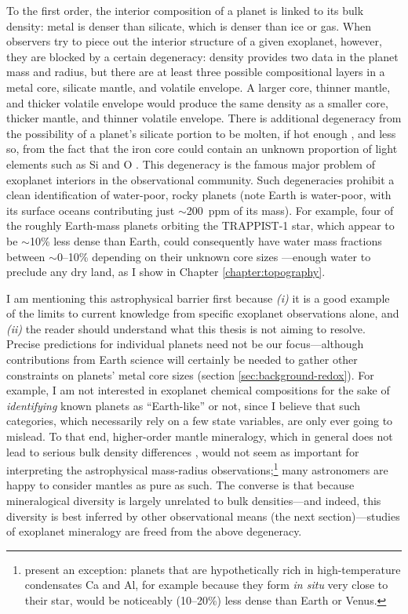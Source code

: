 To the first order, the interior composition of a planet is linked to its bulk density: metal is denser than silicate, which is denser than ice or gas. When observers try to piece out the interior structure of a given exoplanet, however, they are blocked by a certain degeneracy: density provides two data in the planet mass and radius, but there are at least three possible compositional layers in a metal core, silicate mantle, and volatile envelope. A larger core, thinner mantle, and thicker volatile envelope would produce the same density as a smaller core, thicker mantle, and thinner volatile envelope. There is additional degeneracy from the possibility of a planet's silicate portion to be molten, if hot enough \citep[inducing $\sim$10\% density variations;][]{bower_linking_2019}, and less so, from the fact that the iron core could contain an unknown proportion of light elements such as Si and O \citep{unterborn_scaling_2016}. This degeneracy is the famous major problem of exoplanet interiors in the observational community. Such degeneracies prohibit a clean identification of water-poor, rocky planets (note Earth is water-poor, with its surface oceans contributing just $\sim$200~ppm of its mass). For example, four of the roughly Earth-mass planets orbiting the TRAPPIST-1 star, which appear to be $\sim$10\% less dense than Earth, could consequently have water mass fractions between $\sim$0--10\% depending on their unknown core sizes \citep{unterborn_inward_2018, agol_refining_2021}---enough water to preclude any dry land, as I show in Chapter \ref{chapter:topography}. 

I am mentioning this astrophysical barrier first because \textit{(i)} it is a good example of the limits to current knowledge from specific exoplanet observations alone, and \textit{(ii)} the reader should understand what this thesis is not aiming to resolve. Precise predictions for individual planets need not be our focus---although contributions from Earth science will certainly be needed to gather other constraints on planets' metal core sizes (section \ref{sec:background-redox}). For example, I am not interested in exoplanet chemical compositions for the sake of \textit{identifying} known planets as ``Earth-like'' or not, since I believe that such categories, which necessarily rely on a few state variables, are only ever going to mislead. To that end, higher-order mantle mineralogy, which in general does not lead to serious bulk density differences \citep{dorn_can_2015, unterborn_scaling_2016}, would not seem as important for interpreting the astrophysical mass-radius observations;\footnote{\citet{dorn_new_2019} present an exception: planets that are hypothetically rich in high-temperature condensates Ca and Al, for example because they form \textit{in situ} very close to their star, would be noticeably (10--20\%) less dense than Earth or Venus.} many astronomers are happy to consider mantles as pure  as such. The converse is that because mineralogical diversity is largely unrelated to bulk densities---and indeed, this diversity is best inferred by other observational means (the next section)---studies of exoplanet mineralogy are freed from the above degeneracy.


